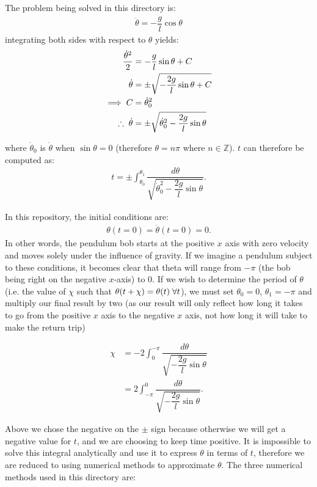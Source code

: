\documentclass[12pt,a4paper,openright]{article}
\begin{document}
	The problem being solved in this directory is:
	\begin{align*}
	\ddot{\theta} = -\dfrac{g}{l} \cos{\theta}
	\end{align*}
	integrating both sides with respect to $\theta$ yields:
	\begin{align*}
		\dfrac{\dot{\theta}^2}{2} &= -\dfrac{g}{l} \sin{\theta} + C \\
		\dot{\theta} &= \pm \sqrt{-\dfrac{2g}{l} \sin{\theta} + C}\\
		\implies C &= \dot{\theta}_0^2 \\
		\therefore \hspace{0.1cm} \dot{\theta} &= \pm \sqrt{\dot{\theta}_0^2 - \dfrac{2g}{l} \sin{\theta}}
	\end{align*}

	where $\dot{\theta}_0$ is $\dot{\theta}$ when $\sin{\theta} = 0$ (therefore $\theta =n\pi$ where $n\in\mathbb{Z}$). $t$ can therefore be computed as:
	\begin{align*}
	t = \pm \int_{\theta_0}^{\theta_1} \dfrac{d\theta}{\sqrt{\dot{\theta}_0^2 - \dfrac{2g}{l} \sin{\theta}}}.
	\end{align*}

	In this repository, the initial conditions are:
	\begin{align*}
	\theta(t=0) = \dot{\theta}(t=0) = 0.
	\end{align*}
	In other words, the pendulum bob starts at the positive $x$ axis with zero velocity and moves solely under the influence of gravity. If we imagine a pendulum subject to these conditions, it becomes clear that theta will range from $-\pi$ (the bob being right on the negative $x$-axis) to $0$. If we wish to determine the period of $\theta$ (i.e. the value of $\chi$ such that $\theta(t+\chi) = \theta(t) \hspace{0.1cm}\forall t$), we must set $\theta_0=0$, $\theta_1 = -\pi$ and multiply our final result by two (as our result will only reflect how long it takes to go from the positive $x$ axis to the negative $x$ axis, not how long it will take to make the return trip)

	\begin{align*}
	\chi &= - 2\int_{0}^{-\pi} \dfrac{d\theta}{\sqrt{- \dfrac{2g}{l} \sin{\theta}}} \\
	  &= 2\int_{-\pi}^{0} \dfrac{d\theta}{\sqrt{- \dfrac{2g}{l} \sin{\theta}}}.
	\end{align*}

	Above we chose the negative on the $\pm$ sign because otherwise we will get a negative value for $t$, and we are choosing to keep time positive. It is impossible to solve this integral analytically and use it to express $\theta$ in terms of $t$, therefore we are reduced to using numerical methods to approximate $\theta$. The three numerical methods used in this directory are:
\end{document}
